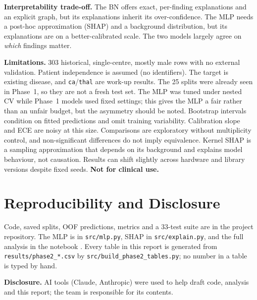 \documentclass[conference]{IEEEtran}
\begin{document}
\textbf{Interpretability trade-off.} The BN offers exact, per-finding explanations and an explicit graph, but its explanations inherit its over-confidence. The MLP needs a post-hoc approximation (SHAP) and a background distribution, but its explanations are on a better-calibrated scale. The two models largely agree on \emph{which} findings matter.

\textbf{Limitations.} 303 historical, single-centre, mostly male rows with no external validation. Patient independence is assumed (no identifiers). The target is existing disease, and \texttt{ca}/\texttt{thal} are work-up results. The 25 splits were already seen in Phase~1, so they are not a fresh test set. The MLP was tuned under nested CV while Phase~1 models used fixed settings; this gives the MLP a fair rather than an unfair budget, but the asymmetry should be noted. Bootstrap intervals condition on fitted predictions and omit training variability. Calibration slope and ECE are noisy at this size. Comparisons are exploratory without multiplicity control, and non-significant differences do not imply equivalence. Kernel SHAP is a sampling approximation that depends on its background and explains model behaviour, not causation. Results can shift slightly across hardware and library versions despite fixed seeds. \textbf{Not for clinical use.}

\section{Reproducibility and Disclosure}
Code, saved splits, OOF predictions, metrics and a 33-test suite are in the project repository. The MLP is in \texttt{src/mlp.py}, SHAP in \texttt{src/explain.py}, and the full analysis in the notebook . Every table in this report is generated from \texttt{results/phase2\_*.csv} by \texttt{src/build\_phase2\_tables.py}; no number in a table is typed by hand.

\textbf{Disclosure.} AI tools (Claude, Anthropic) were used to help draft code, analysis and this report; the team is responsible for its contents.



\end{document}
